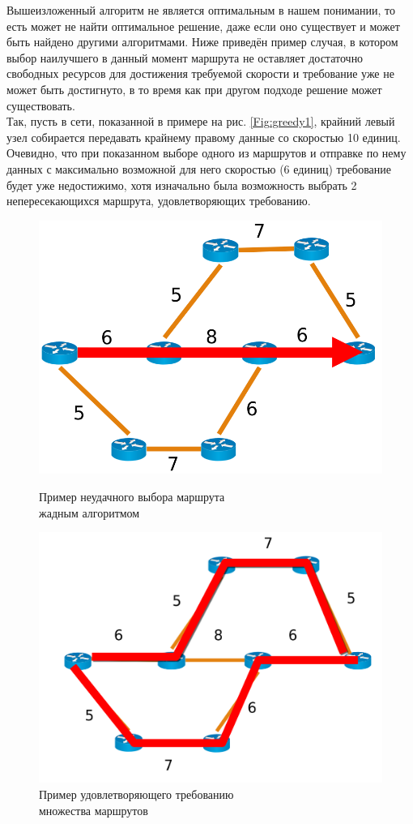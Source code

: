 \documentclass[a4paper]{article}
\begin{document}
Вышеизложенный алгоритм не является оптимальным в нашем понимании, то есть может не найти оптимальное решение, даже если оно существует и может быть найдено другими алгоритмами.
Ниже приведён пример случая, в котором выбор наилучшего в данный момент маршрута не оставляет достаточно свободных ресурсов для достижения требуемой скорости и требование уже не может быть достигнуто, в то время как при другом подходе решение может существовать.\\
Так, пусть в сети, показанной в примере на рис. \ref{Fig:greedy1}, крайний левый узел собирается передавать крайнему правому данные со скоростью 10 единиц. Очевидно, что при показанном выборе одного из маршрутов и отправке по нему данных с максимально возможной для него скоростью (6 единиц) требование будет уже недостижимо, хотя изначально была возможность выбрать 2 непересекающихся маршрута, удовлетворяющих требованию.

\begin{figure}[H]
   \begin{minipage}{0.5\textwidth}
     \centering
    \includegraphics[width=.7\linewidth]{greedy1.png}
    \caption{Пример неудачного выбора маршрута\\ жадным алгоритмом}\label{Fig:greedy1}
   \end{minipage}
   \begin{minipage}{0.5\textwidth}
     \centering
     \includegraphics[width=.7\linewidth]{greedy2.png}
     \caption{Пример удовлетворяющего требованию\\ множества маршрутов}\label{Fig:greedy2}
   \end{minipage}\hfill
\end{figure}
\end{document}
